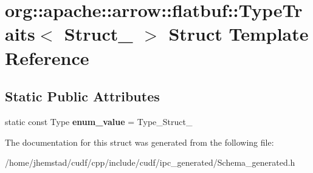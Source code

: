 \hypertarget{structorg_1_1apache_1_1arrow_1_1flatbuf_1_1TypeTraits_3_01Struct___01_4}{}\section{org\+:\+:apache\+:\+:arrow\+:\+:flatbuf\+:\+:Type\+Traits$<$ Struct\+\_\+ $>$ Struct Template Reference}
\label{structorg_1_1apache_1_1arrow_1_1flatbuf_1_1TypeTraits_3_01Struct___01_4}
\subsection*{Static Public Attributes}
\begin{DoxyCompactItemize}
\item 
static const Type {\bfseries enum\+\_\+value} = Type\+\_\+\+Struct\+\_\+\hypertarget{structorg_1_1apache_1_1arrow_1_1flatbuf_1_1TypeTraits_3_01Struct___01_4_a1a1735da15bb1c94b57df10fd075adf9}{}\label{structorg_1_1apache_1_1arrow_1_1flatbuf_1_1TypeTraits_3_01Struct___01_4_a1a1735da15bb1c94b57df10fd075adf9}

\end{DoxyCompactItemize}


The documentation for this struct was generated from the following file\+:\begin{DoxyCompactItemize}
\item 
/home/jhemstad/cudf/cpp/include/cudf/ipc\+\_\+generated/Schema\+\_\+generated.\+h\end{DoxyCompactItemize}
